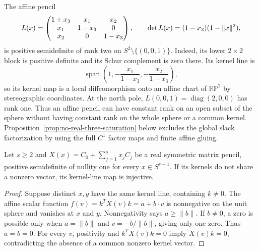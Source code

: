 \begin{example}
\label{ex:local-real-three-pencil}
The affine pencil
\[
 L(x)=\begin{pmatrix}
 1+x_3&x_1&x_2\\x_1&1-x_3&0\\x_2&0&1-x_3
 \end{pmatrix},\qquad
 \det L(x)=(1-x_3)(1-\lVert x\rVert^2),
\]
is positive semidefinite of rank two on $S^2\setminus\{(0,0,1)\}$.
Indeed, its lower $2\times2$ block is positive definite and its Schur
complement is zero there. Its kernel line is
\[
 \operatorname{span}\left(1,-\frac{x_1}{1-x_3},
                              -\frac{x_2}{1-x_3}\right),
\]
so its kernel map is a local diffeomorphism onto an affine chart of
$\mathbb{RP}^2$ by stereographic coordinates. At the north pole,
$L(0,0,1)=\operatorname{diag}(2,0,0)$ has rank one.
Thus an affine pencil can have constant rank on an open subset of the
sphere without having constant rank on the whole sphere or a common
kernel.
Proposition~\ref{prop:no-real-three-saturation}
below excludes the global slack factorization by using the full $C^1$
factor maps and finite affine gluing.
\end{example}

\begin{lemma}
\label{lem:affine-kernel-injective}
Let $s\geq2$ and $X(x)=C_0+\sum_{j=1}^s x_jC_j$ be a real symmetric
matrix pencil, positive semidefinite of nullity one for every
$x\in S^{s-1}$. If its kernels do not share a nonzero vector, its
kernel-line map is injective.
\end{lemma}
\begin{proof}
Suppose distinct $x,y$ have the same kernel line, containing $k\ne0$.
The affine scalar function $f(v)=k^TX(v)k=a+b\cdot v$ is nonnegative on
the unit sphere and vanishes at $x$ and $y$. Nonnegativity says
$a\geq\|b\|$. If $b\ne0$, a zero is possible only when
$a=\|b\|$ and $v=-b/\|b\|$, giving only one zero. Thus $a=b=0$.
For every $v$, positivity and $k^TX(v)k=0$ imply $X(v)k=0$, contradicting
the absence of a common nonzero kernel vector.
\end{proof}

